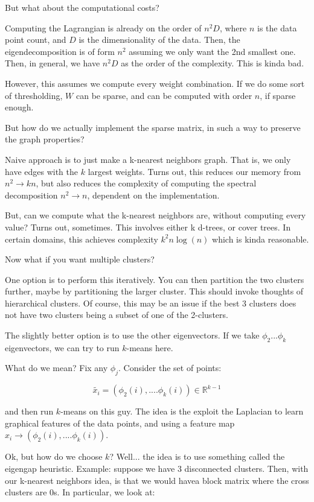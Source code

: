 \documentclass[10pt]{article}
\begin{document}
But what about the computational costs?

Computing the Lagrangian is already on the order of $n^2D$, where $n$ is the data point count, and $D$ is the dimensionality of the data. Then, the eigendecomposition is of form $n^2$ assuming we only want the 2nd smallest one. Then, in general, we have $n^2D$ as the order of the complexity. This is kinda bad.

However, this assumes we compute every weight combination. If we do some sort of thresholding, $W$ can be sparse, and can be computed with order $n$, if sparse enough. 

But how do we actually implement the sparse matrix, in such a way to preserve the graph properties?

Naive approach is to just make a k-nearest neighbors graph. That is, we only have edges with the $k$ largest weights. Turns out, this reduces our memory from $n^2 \to kn$, but also reduces the complexity of computing the spectral decomposition $n^2 \to n$, dependent on the implementation.

But, can we compute what the k-nearest neighbors are, without computing every value? Turns out, sometimes. This involves either k d-trees, or cover trees. In certain domains, this achieves complexity $k^2 n \log(n)$ which is kinda reasonable.

Now what if you want multiple clusters? 

One option is to perform this iteratively. You can then partition the two clusters further, maybe by partitioning the larger cluster. This should invoke thoughts of hierarchical clusters. Of course, this may be an issue if the best 3 clusters does not have two clusters being a subset of one of the 2-clusters. 

The slightly better option is to use the other eigenvectors. If we take $\phi_2...\phi_k$ eigenvectors, we can try to run $k$-means here. 

What do we mean? Fix any $\phi_j$. Consider the set of points:

$$\tilde{x_i} = (\phi_2(i), ....\phi_k(i)) \in \mathbb{R}^{k-1}$$

and then run $k$-means on this guy. The idea is the exploit the Laplacian to learn graphical features of the data points, and using a feature map $x_i \to  (\phi_2(i), ....\phi_k(i))$.

Ok, but how do we choose $k$? Well... the idea is to use something called the eigengap heuristic. Example: suppose we have 3 disconnected clusters. Then, with our k-nearest neighbors idea, is that we would havea block matrix where the cross clusters are 0s. In particular, we look at:
\end{document}
